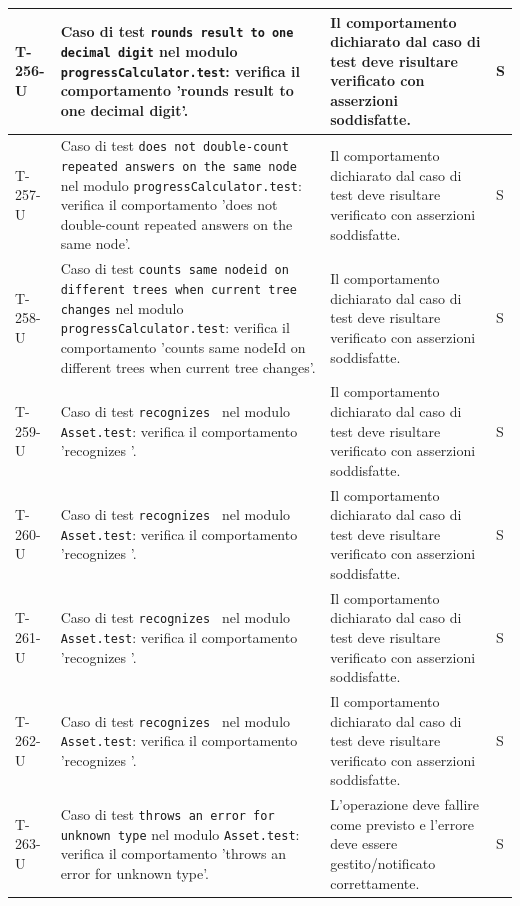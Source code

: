 \documentclass[a4paper,12pt]{article}
\begin{document}
{{\begin{longtable}{|>{\RaggedRight\arraybackslash}p{1.55cm}|>{\RaggedRight\arraybackslash}p{8.0cm}|>{\RaggedRight\arraybackslash}p{4.6cm}|>{\RaggedRight\arraybackslash}p{1.2cm}|}
        \hline
        T-256-U & Caso di test \texttt{rounds result to one decimal digit} nel modulo \texttt{progressCalculator.test}: verifica il comportamento 'rounds result to one decimal digit'. & Il comportamento dichiarato dal caso di test deve risultare verificato con asserzioni soddisfatte. & S \\
        \hline
        T-257-U & Caso di test \texttt{does not double-count repeated answers on the same node} nel modulo \texttt{progressCalculator.test}: verifica il comportamento 'does not double-count repeated answers on the same node'. & Il comportamento dichiarato dal caso di test deve risultare verificato con asserzioni soddisfatte. & S \\
        \hline
        T-258-U & Caso di test \texttt{counts same nodeid on different trees when current tree changes} nel modulo \texttt{progressCalculator.test}: verifica il comportamento 'counts same nodeId on different trees when current tree changes'. & Il comportamento dichiarato dal caso di test deve risultare verificato con asserzioni soddisfatte. & S \\
        \hline
        T-259-U & Caso di test \texttt{recognizes } nel modulo \texttt{Asset.test}: verifica il comportamento 'recognizes '. & Il comportamento dichiarato dal caso di test deve risultare verificato con asserzioni soddisfatte. & S \\
        \hline
        T-260-U & Caso di test \texttt{recognizes } nel modulo \texttt{Asset.test}: verifica il comportamento 'recognizes '. & Il comportamento dichiarato dal caso di test deve risultare verificato con asserzioni soddisfatte. & S \\
        \hline
        T-261-U & Caso di test \texttt{recognizes } nel modulo \texttt{Asset.test}: verifica il comportamento 'recognizes '. & Il comportamento dichiarato dal caso di test deve risultare verificato con asserzioni soddisfatte. & S \\
        \hline
        T-262-U & Caso di test \texttt{recognizes } nel modulo \texttt{Asset.test}: verifica il comportamento 'recognizes '. & Il comportamento dichiarato dal caso di test deve risultare verificato con asserzioni soddisfatte. & S \\
        \hline
        T-263-U & Caso di test \texttt{throws an error for unknown type} nel modulo \texttt{Asset.test}: verifica il comportamento 'throws an error for unknown type'. & L'operazione deve fallire come previsto e l'errore deve essere gestito/notificato correttamente. & S \\

\end{longtable}}}
\end{document}
